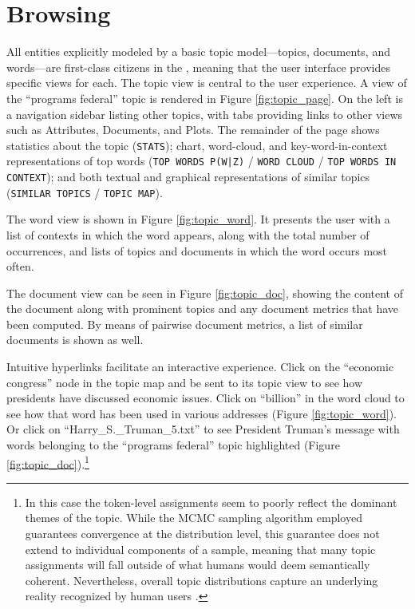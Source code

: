 \documentclass[11pt]{article}
\begin{document}
\section{Browsing}
All entities explicitly modeled by a basic topic model---topics, documents, %
and words---are first-class citizens in the \tool, meaning that the user
interface provides specific views for each. The topic view
is central to the user experience. A view of the ``programs federal'' topic is
rendered in Figure \ref{fig:topic_page}. On the left is a navigation sidebar listing other topics,
with tabs providing links to other views such as Attributes, Documents, and Plots.
The remainder of the page shows statistics about the topic
(\texttt{STATS}); chart, word-cloud, and key-word-in-context representations of top %
words (\texttt{TOP WORDS P(W|Z)} / \texttt{WORD CLOUD} / \texttt{TOP WORDS IN CONTEXT}); and
both textual and graphical representations of similar topics (\texttt{SIMILAR
TOPICS} / \texttt{TOPIC MAP}).

The word view is shown in Figure \ref{fig:topic_word}. It presents the user with
a list of contexts in which the word appears, along with the total number of
occurrences, and lists of topics and documents in which the word occurs most
often. 

The document view can be seen in Figure \ref{fig:topic_doc}, showing the content
of the document along with prominent topics and any document metrics that have been computed. By
means of pairwise document metrics, a list of similar documents is shown as
well.

Intuitive hyperlinks facilitate an interactive experience. Click on the %
``economic congress'' node in the topic map and be sent to its topic view
to see how presidents have discussed economic issues. Click on ``billion'' in
the word cloud to see how that word has been used in various addresses (Figure
\ref{fig:topic_word}). Or click on ``Harry\_S.\_Truman\_5.txt'' to see
President Truman's message with words belonging to the ``programs federal''
topic highlighted (Figure \ref{fig:topic_doc}).\footnote{In this case the token-level
assignments seem to poorly reflect the dominant themes of the topic. While
the MCMC sampling algorithm employed guarantees convergence at the distribution
level, this guarantee does not extend to individual components of a sample,
meaning that many topic assignments will fall outside of what humans would deem
semantically coherent. Nevertheless, overall topic distributions capture
an underlying reality recognized by human users \cite{Chang2009}.}
\end{document}
